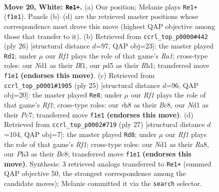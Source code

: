 \documentclass[11pt]{article}
\begin{document}
\clearpage

\begin{figure}[p]\centering
\begin{subfigure}{0.46\textwidth}\centering
\resizebox{\linewidth}{!}{%
\newchessgame
\chessboard[
  setfen={1n1qkbnr/1Q4p1/r1p5/p2p2P1/1p1P2Bp/7P/PPP2P2/R1BN1RK1 w - - 4 20},
  showmover=false,
  pgfstyle=straightmove, color=movearrow, markmove={f1-e1}
]}
\caption{}
\end{subfigure}\hfill
\begin{subfigure}{0.46\textwidth}\centering
\resizebox{\linewidth}{!}{%
\newchessgame
\chessboard[
  setfen={r1bq1r2/pp2pk1p/n5pQ/2P1n3/2p5/2N5/PP2PPP1/R3KB1R w KQ - 2 14},
  showmover=false,
  pgfstyle=straightmove, color=movearrow, markmove={a1-d1}
]}
\caption{}
\end{subfigure}
\\[4pt]
\begin{subfigure}{0.46\textwidth}\centering
\resizebox{\linewidth}{!}{%
\newchessgame
\chessboard[
  setfen={r1b2rk1/2p1bppp/p2p1n2/N1p5/q1P1P3/8/PP1B1PPP/RN2QRK1 b - - 2 13},
  showmover=false,
  pgfstyle=straightmove, color=movearrow, markmove={f8-e8}
]}
\caption{}
\end{subfigure}\hfill
\begin{subfigure}{0.46\textwidth}\centering
\resizebox{\linewidth}{!}{%
\newchessgame
\chessboard[
  setfen={rnb2rk1/pp2bpp1/4p2p/q3P3/2BpN3/P4N2/1P2QPPP/R2R2K1 b - - 0 14},
  showmover=false,
  pgfstyle=straightmove, color=movearrow, markmove={f8-d8}
]}
\caption{}
\end{subfigure}
\caption{\textbf{Move 20, White: \texttt{Re1+}.} (a) Our position; Melanie plays \texttt{Re1+} (\texttt{f1e1}). Panels (b)--(d) are the retrieved master positions whose correspondence most drove this move (highest QAP objective among those that transfer to it). (b) Retrieved from \texttt{ccrl\_top\_p0000\#442} (ply 26) [structural distance $d$=97, QAP obj=23]: the master played \texttt{Rd1}; under $\mu$ our \emph{Rf1} plays the role of that game's \emph{Ra1}; cross-type roles: our \emph{N}d1 as their \emph{B}f1, our \emph{p}d5 as their \emph{R}h1; transferred move \texttt{f1e1} \textbf{(endorses this move)}. (c) Retrieved from \texttt{ccrl\_top\_p0001\#1905} (ply 25) [structural distance $d$=96, QAP obj=20]: the master played \texttt{Re8}; under $\mu$ our \emph{Rf1} plays the role of that game's \emph{Rf1}; cross-type roles: our \emph{r}h8 as their \emph{B}c8, our \emph{N}d1 as their \emph{P}c7; transferred move \texttt{f1e1} \textbf{(endorses this move)}. (d) Retrieved from \texttt{ccrl\_top\_p0002\#719} (ply 27) [structural distance $d$=104, QAP obj=7]: the master played \texttt{Rd8}; under $\mu$ our \emph{Rf1} plays the role of that game's \emph{Rf1}; cross-type roles: our \emph{N}d1 as their \emph{R}a8, our \emph{P}h3 as their \emph{B}c8; transferred move \texttt{f1e1} \textbf{(endorses this move)}. Synthesis: 3 retrieved analogs transferred to \texttt{Re1+} (summed QAP objective 50, the strongest correspondence among the candidate moves); Melanie committed it via the \texttt{search} selector.}
\label{fig:thought-m38}
\end{figure}
\end{document}
